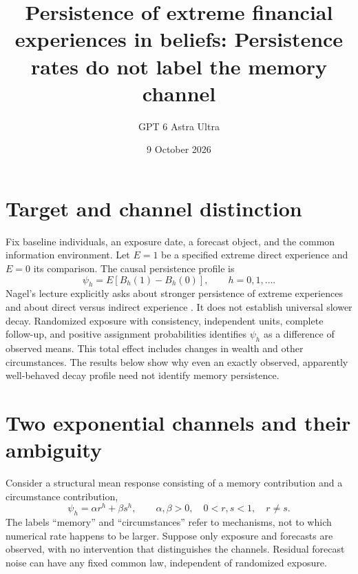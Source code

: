 \documentclass[11pt]{article}
\title{Persistence of extreme financial experiences in beliefs: Persistence rates do not label the memory channel}
\author{GPT 6 Astra Ultra}
\date{9 October 2026}
\theoremstyle{definition}
\begin{document}
\maketitle

\section*{Target and channel distinction}
Fix baseline individuals, an exposure date, a forecast object, and the
common information environment. Let $E=1$ be a specified extreme direct
experience and $E=0$ its comparison. The causal persistence profile is
\[
 \psi_h=E[B_h(1)-B_h(0)],\qquad h=0,1,\ldots.
\]
Nagel's lecture explicitly asks about stronger persistence of extreme
experiences and about direct versus indirect experience
\cite[PDF pp. 10--11]{nagel}. It does not establish universal slower
decay. Randomized exposure with consistency, independent units, complete
follow-up, and positive assignment probabilities identifies $\psi_h$ as
a difference of observed means. This total effect includes changes in
wealth and other circumstances. The results below show why even an
exactly observed, apparently well-behaved decay profile need not identify
memory persistence.

\section*{Two exponential channels and their ambiguity}
Consider a structural mean response consisting of a memory contribution
and a circumstance contribution,
\[
 \psi_h=\alpha r^h+\beta s^h,
 \qquad \alpha,\beta>0,\quad 0<r,s<1,\quad r\ne s.        \tag{1}
\]
The labels ``memory'' and ``circumstances'' refer to mechanisms, not to
which numerical rate happens to be larger. Suppose only exposure and
forecasts are observed, with no intervention that distinguishes the
channels. Residual forecast noise can have any fixed common law,
independent of randomized exposure.
\end{document}
